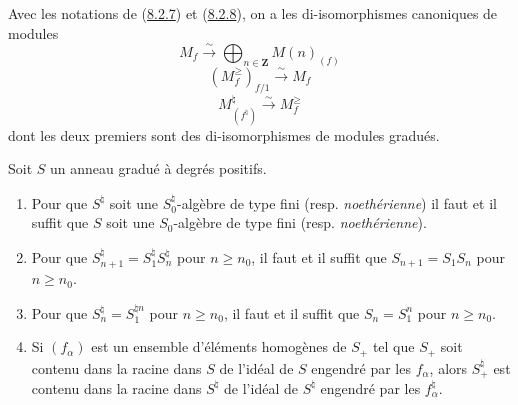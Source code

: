 \begin{lemma}[8.2.9]
\label{II.8.2.9-fr}
Avec les notations de \textup{(\hyperref[II.8.2.7-fr]{8.2.7})} et
\textup{(\hyperref[II.8.2.8-fr]{8.2.8})}, on a les di-isomorphismes canoniques de
modules
\begin{equation}
\label{II.8.2.9.1-fr}
  M_f\xrightarrow{\sim}\bigoplus_{n\in\mathbf{Z}}M(n)_{(f)}
\tag{8.2.9.1}
\end{equation}
\begin{equation}
\label{II.8.2.9.2-fr}
  (M_f^{\geq})_{f/1}\xrightarrow{\sim}M_f
\tag{8.2.9.2}
\end{equation}
\begin{equation}
\label{II.8.2.9.3-fr}
  M^\natural_{(f^\natural)}\xrightarrow{\sim}M_f^{\geq}
\tag{8.2.9.3}
\end{equation}
dont les deux premiers sont des di-isomorphismes de modules gradués.
\end{lemma}

\begin{lemma}[8.2.10]
\label{II.8.2.10-fr}
Soit $S$ un anneau gradué à degrés positifs.
\begin{enumerate}
\item[\rm(i)] Pour que $S^\natural$ soit une $S_0^\natural$-algèbre de type
fini \textup{(resp. \emph{noethérienne})} il faut et il suffit que $S$ soit une $S_0$-algèbre
de type fini \textup{(resp. \emph{noethérienne})}.
\item[\rm(ii)] Pour que $S_{n+1}^\natural=S_1^\natural S_n^\natural$ pour
$n\geq n_0$, il faut et il suffit que $S_{n+1}=S_1S_n$ pour $n\geq n_0$.
\item[\rm(iii)] Pour que $S_n^\natural=S_1^{\natural n}$ pour $n\geq n_0$, il
faut et il suffit que $S_n=S_1^n$ pour $n\geq n_0$.
\item[\rm(iv)] Si $(f_\alpha)$ est un ensemble d'éléments homogènes de $S_+$
tel que $S_+$ soit contenu dans la racine dans $S$ de l'idéal de $S$ engendré par
les $f_\alpha$, alors $S_+^\natural$ est contenu dans la racine dans $S^\natural$ de
l'idéal de $S^\natural$ engendré par les $f_\alpha^\natural$.
\end{enumerate}
\end{lemma}

